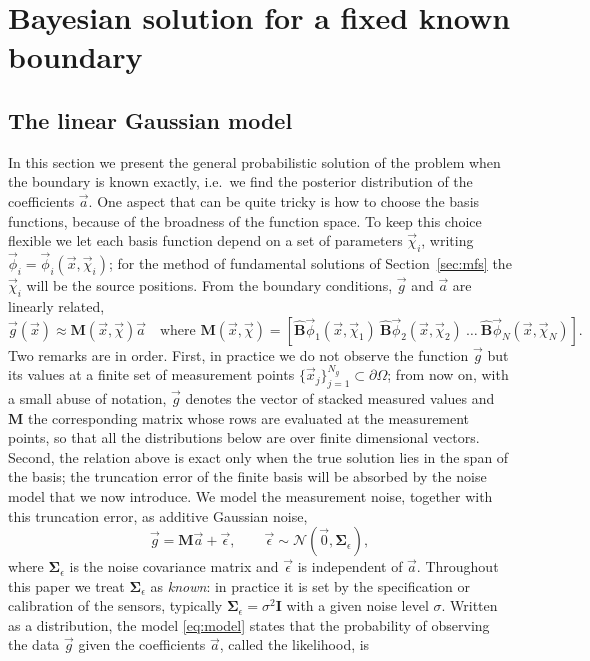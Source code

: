 \documentclass{article}
\begin{document}
\section{Bayesian solution for a fixed known boundary} \label{sec:fixed_boundary}

\subsection{The linear Gaussian model}
In this section we present the general probabilistic solution of the problem when the boundary is known exactly, i.e.\ we find the posterior distribution of the coefficients $\vec{a}$. One aspect that can be quite tricky is how to choose the basis functions, because of the broadness of the function space. To keep this choice flexible we let each basis function depend on a set of parameters $\vec{\chi}_i$, writing $\vec{\phi}_i = \vec{\phi}_i(\vec{x}, \vec{\chi}_i)$; for the method of fundamental solutions of Section~\ref{sec:mfs} the $\vec{\chi}_i$ will be the source positions. From the boundary conditions, $\vec{g}$ and $\vec{a}$ are linearly related,
\begin{equation}
     \vec{g}(\vec x) \approx \mathbf{M}(\vec{x},\vec{\chi})\vec{a} \quad \text{where } \mathbf{M}(\vec x, \vec \chi)=[\mathbf{\hat{B}} \vec{\phi}_1 (%
\vec{x}, \vec{\chi}_1) \ \mathbf{\hat{B}}\vec{\phi}_2(\vec{x}, \vec{\chi}_2) \ \ldots \ \mathbf{\hat{B}}\vec{\phi}_N(\vec{x}, \vec{\chi}_N)].
 \end{equation}
Two remarks are in order. First, in practice we do not observe the function $\vec{g}$ but its values at a finite set of measurement points $\{\vec{x}_j\}_{j=1}^{N_g} \subset \partial\Omega$; from now on, with a small abuse of notation, $\vec{g}$ denotes the vector of stacked measured values and $\mathbf{M}$ the corresponding matrix whose rows are evaluated at the measurement points, so that all the distributions below are over finite dimensional vectors. Second, the relation above is exact only when the true solution lies in the span of the basis; the truncation error of the finite basis will be absorbed by the noise model that we now introduce. We model the measurement noise, together with this truncation error, as additive Gaussian noise,
\begin{equation}
    \vec{g} = \mathbf{M}\vec{a} + \vec{\epsilon}, \qquad \vec{\epsilon} \sim \mathcal{N}(\vec{0}, \mathbf{\Sigma}_\epsilon), \label{eq:model}
\end{equation}
where $\mathbf{\Sigma}_\epsilon$ is the noise covariance matrix and $\vec\epsilon$ is independent of $\vec a$. Throughout this paper we treat $\mathbf{\Sigma}_\epsilon$ as \emph{known}: in practice it is set by the specification or calibration of the sensors, typically $\mathbf{\Sigma}_\epsilon = \sigma^2\mathbf I$ with a given noise level $\sigma$. Written as a distribution, the model \eqref{eq:model} states that the probability of observing the data $\vec g$ given the coefficients $\vec a$, called the likelihood, is
\end{document}
